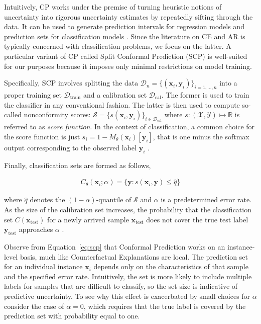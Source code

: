 \documentclass{article}
\begin{document}
Intuitively, CP works under the premise of turning heuristic notions of uncertainty into rigorous uncertainty estimates by repeatedly sifting through the data. It can be used to generate prediction intervals for regression models and prediction sets for classification models \citep{altmeyer2022conformal}. Since the literature on CE and AR is typically concerned with classification problems, we focus on the latter. A particular variant of CP called Split Conformal Prediction (SCP) is well-suited for our purposes because it imposes only minimal restrictions on model training. 

Specifically, SCP involves splitting the data $\mathcal{D}_n=\{(\mathbf{x}_i,\mathbf{y}_i)\}_{i=1,...,n}$ into a proper training set $\mathcal{D}_{\text{train}}$ and a calibration set $\mathcal{D}_{\text{cal}}$. The former is used to train the classifier in any conventional fashion. The latter is then used to compute so-called nonconformity scores: $\mathcal{S}=\{s(\mathbf{x}_i,\mathbf{y}_i)\}_{i \in \mathcal{D}_{\text{cal}}}$ where $s: (\mathcal{X},\mathcal{Y}) \mapsto \mathbb{R}$ is referred to as \textit{score function}. In the context of classification, a common choice for the score function is just $s_i=1-M_{\theta}(\mathbf{x}_i)[\mathbf{y}_i]$, that is one minus the softmax output corresponding to the observed label $\mathbf{y}_i$ \citep{angelopoulos2021gentle}. 

Finally, classification sets are formed as follows,

\begin{equation}\label{eq:scp}
  \begin{aligned}
    C_{\theta}(\mathbf{x}_i;\alpha)=\{\mathbf{y}: s(\mathbf{x}_i,\mathbf{y}) \le \hat{q}\}
  \end{aligned}
\end{equation}

where $\hat{q}$ denotes the $(1-\alpha)$-quantile of $\mathcal{S}$ and $\alpha$ is a predetermined error rate. As the size of the calibration set increases, the probability that the classification set $C(\mathbf{x}_{\text{test}})$ for a newly arrived sample $\mathbf{x}_{\text{test}}$ does not cover the true test label $\mathbf{y}_{\text{test}}$ approaches $\alpha$ \citep{angelopoulos2021gentle}. 

Observe from Equation~\ref{eq:scp} that Conformal Prediction works on an instance-level basis, much like Counterfactual Explanations are local. The prediction set for an individual instance $\mathbf{x}_i$ depends only on the characteristics of that sample and the specified error rate. Intuitively, the set is more likely to include multiple labels for samples that are difficult to classify, so the set size is indicative of predictive uncertainty. To see why this effect is exacerbated by small choices for $\alpha$ consider the case of $\alpha=0$, which requires that the true label is covered by the prediction set with probability equal to one.
\end{document}
